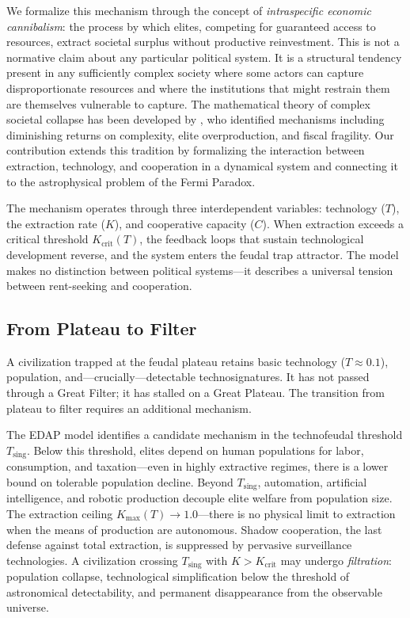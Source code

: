 We formalize this mechanism through the concept of \emph{intraspecific economic cannibalism}: the process by which elites, competing for guaranteed access to resources, extract societal surplus without productive reinvestment. This is not a normative claim about any particular political system. It is a structural tendency present in any sufficiently complex society where some actors can capture disproportionate resources and where the institutions that might restrain them are themselves vulnerable to capture. The mathematical theory of complex societal collapse has been developed by \citet{tainter1988,turchin2003,turchin2016}, who identified mechanisms including diminishing returns on complexity, elite overproduction, and fiscal fragility. Our contribution extends this tradition by formalizing the interaction between extraction, technology, and cooperation in a dynamical system and connecting it to the astrophysical problem of the Fermi Paradox.

The mechanism operates through three interdependent variables: technology ($T$), the extraction rate ($K$), and cooperative capacity ($C$). When extraction exceeds a critical threshold $K_{\text{crit}}(T)$, the feedback loops that sustain technological development reverse, and the system enters the feudal trap attractor. The model makes no distinction between political systems---it describes a universal tension between rent-seeking and cooperation.

\subsection{From Plateau to Filter}

A civilization trapped at the feudal plateau retains basic technology ($T \approx 0.1$), population, and---crucially---detectable technosignatures. It has not passed through a Great Filter; it has stalled on a Great Plateau. The transition from plateau to filter requires an additional mechanism.

The EDAP model identifies a candidate mechanism in the technofeudal threshold $T_{\text{sing}}$. Below this threshold, elites depend on human populations for labor, consumption, and taxation---even in highly extractive regimes, there is a lower bound on tolerable population decline. Beyond $T_{\text{sing}}$, automation, artificial intelligence, and robotic production decouple elite welfare from population size. The extraction ceiling $K_{\max}(T) \rightarrow 1.0$---there is no physical limit to extraction when the means of production are autonomous. Shadow cooperation, the last defense against total extraction, is suppressed by pervasive surveillance technologies. A civilization crossing $T_{\text{sing}}$ with $K > K_{\text{crit}}$ may undergo \emph{filtration}: population collapse, technological simplification below the threshold of astronomical detectability, and permanent disappearance from the observable universe.

